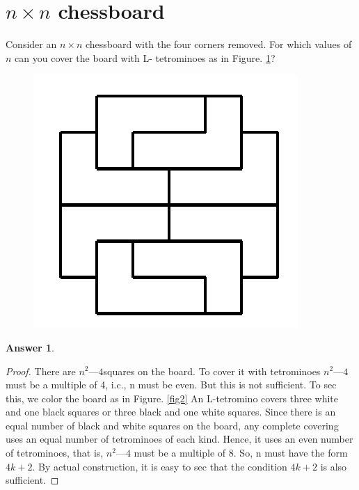 \documentclass{article}
\renewcommand{\(}{\left(}
\renewcommand{\)}{\right)}
\theoremstyle{plain}
\theoremstyle{plain}
\theoremstyle{definition}
\newtheorem*{answer}{Answer}
\begin{document}
\section{$n \times n$ chessboard}
Consider an $ n \times n $ chessboard with the four corners removed. For which values of $n$ can you cover the board with L- tetrominoes as in Figure. \ref{fig1}?
\begin{figure}[h]
\includegraphics[scale=0.5]{fig1}
\caption{}
\label{fig1}
\end{figure}
\begin{shaded}
\begin{answer}
\begin{proof}
There are $ n^2 — 4 $squares on the board. To cover it with tetrominoes $ n^2 — 4 $ must be a multiple of 4, i.c., n must be even. But this is not sufficient. To sec this, we color the board as in Figure. \ref{fig2} An L-tetromino covers three white and one black squares or three black and one white squares. Since there is an equal number of black and white squares on the board, any complete covering uses an equal number of tetrominoes of each kind. Hence, it uses an even number of tetrominoes, that is, $n^2 — 4$ must be a multiple of 8. So, n must have the form $4k + 2$. By actual construction, it is easy to sec that the condition $4k + 2$ is also sufficient.
\end{proof}
\end{answer}
\end{shaded}
\end{document}
